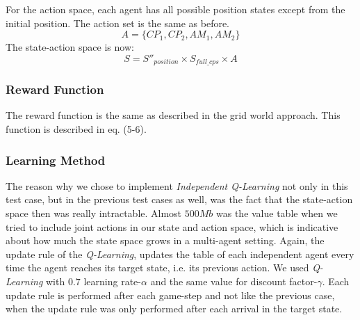 \documentclass[conference]{IEEEtran}
\begin{document}
For the action space, each agent has all possible position states except from the initial position.
The action set is the same as before.
\begin{equation}
A = \lbrace CP_1, CP_2, AM_1, AM_2 \rbrace
\end{equation}
The state-action space is now:
\begin{equation}
S = S''_{position} \times S_{full\_cps} \times A
\end{equation}
\subsubsection{Reward Function}
The reward function is the same as described in the grid world approach. This function is described in eq. (5-6).
\subsubsection{Learning Method}
The reason why we chose to implement \textit{Independent Q-Learning} not only in this test case, but in the previous test cases as well, was the fact that the state-action space then was really intractable. Almost $500Mb$ was the value table when we tried to include joint actions in our state and action space, which is indicative about how much the state space grows in a multi-agent setting.
Again, the update rule of the \textit{Q-Learning}, updates the table of each independent agent every time the agent reaches its target state, i.e. its previous action. We used \textit{Q-Learning} with $0.7$ learning rate-$\alpha$ and the same value for discount factor-$\gamma$. Each update rule is performed after each game-step and not like the previous case, when the update rule was only performed after each arrival in the target state.
\end{document}
